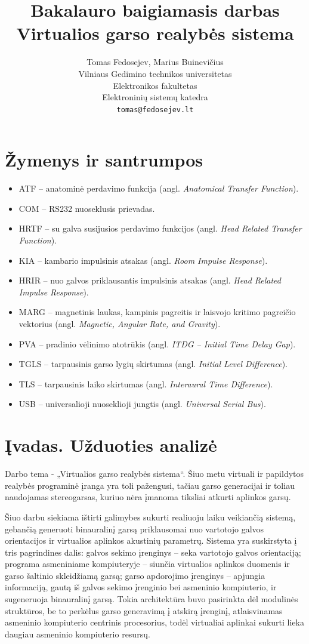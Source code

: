 \documentclass[]{vgtuef}
\author{Tomas Fedosejev, Marius Buinevičius\\Vilniaus Gedimino technikos
  universitetas\\Elektronikos fakultetas\\Elektroninių sistemų
  katedra\\\texttt{tomas@fedosejev.lt}}
\title{Bakalauro baigiamasis darbas\\Virtualios garso realybės sistema}
\begin{document}
\setcounter{page}{7}
\onehalfspacing

\tableofcontents


\section*{Žymenys ir santrumpos}

\begin{itemize}
\item ATF -- anatominė perdavimo funkcija (angl. \textit{Anatomical Transfer Function}).
\item COM -- RS232 nuoseklusis prievadas.
\item HRTF -- su galva susijusios perdavimo funkcijos (angl. \textit{Head Related Transfer Function}).
\item KIA -- kambario impulsinis atsakas (angl. \textit{Room Impulse Response}).
\item HRIR -- nuo galvos priklausantis impulsinis atsakas (angl. \textit{Head Related Impulse Response}).
\item MARG -- magnetinis laukas, kampinis pagreitis ir laisvojo kritimo pagreičio vektorius (angl. \textit{Magnetic, Angular Rate, and Gravity}).
\item PVA -- pradinio vėlinimo atotrūkis (angl. \textit{ITDG – Initial Time Delay Gap}).
\item TGLS -- tarpausinis garso lygių skirtumas (angl. \textit{Initial Level Difference}).
\item TLS -- tarpausinis laiko skirtumas (angl. \textit{Interaural Time Difference}).
\item USB -- universalioji nuoseklioji jungtis (angl. \textit{Universal Serial Bus}).
\end{itemize}

\section{Įvadas. Užduoties analizė}

Darbo tema - „Virtualios garso realybės sistema“. Šiuo metu virtuali ir papildytos realybės programinė įranga yra toli pažengusi, tačiau garso generacijai ir toliau naudojamas stereogarsas, kuriuo nėra įmanoma tiksliai atkurti aplinkos garsų.

Šiuo darbu siekiama ištirti galimybes sukurti realiuoju laiku veikiančią sistemą, gebančią generuoti binauralinį garsą priklausomai nuo vartotojo galvos orientacijos ir virtualios aplinkos akustinių parametrų. Sistema yra suskirstyta į tris pagrindines dalis: galvos sekimo įrenginys -- seka vartotojo galvos orientaciją; programa asmeniniame kompiuteryje -- siunčia virtualios aplinkos duomenis ir garso šaltinio skleidžiamą garsą; garso apdorojimo įrenginys -- apjungia informaciją, gautą iš galvos sekimo įrenginio bei asmeninio kompiuterio, ir sugeneruoja binauralinį garsą. Tokia architektūra buvo pasirinkta dėl modulinės struktūros, be to perkėlus garso generavimą į atskirą įrenginį, atlaisvinamas asmeninio kompiuterio centrinis procesorius, todėl virtualiai aplinkai sukurti lieka daugiau asmeninio kompiuterio resursų.
\end{document}
